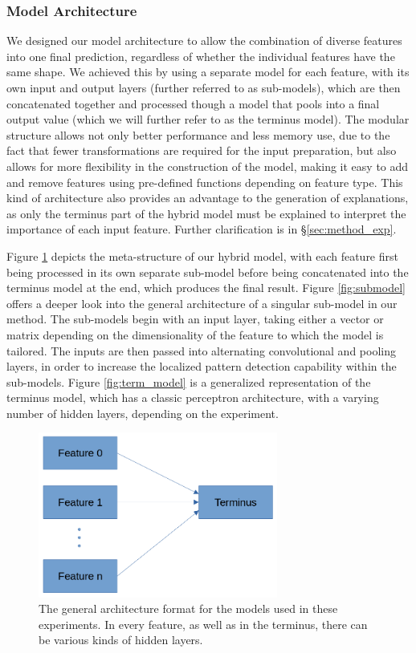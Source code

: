 \documentclass{article}
\begin{document}
			\subsubsection{Model Architecture}
			We designed our model architecture to allow the combination of diverse features into
			one final prediction, regardless of whether the individual features have the same
			shape. We achieved this by using a separate model for each feature, with its own input
			and output layers (further referred to as sub-models), which are then concatenated
			together and processed though a model that pools into a final output value (which we
			will further refer to as the terminus model). The modular structure allows not only
			better performance and less memory use, due to the fact that fewer transformations are
			required for the input preparation, but also allows for more flexibility in the
			construction of the model, making it easy to add and remove features using pre-defined
			functions depending on feature type. This kind of architecture also provides an
			advantage to the generation of explanations, as only the terminus part of the hybrid
			model must be explained to interpret the importance of each input feature. Further
			clarification is in §\ref{sec:method_exp}.
			\par
			Figure \ref{fig:model_plot} depicts the meta-structure of our hybrid model, with each
			feature first being processed in its own separate sub-model before being concatenated
			into the terminus model at the end, which produces the final result. Figure
			\ref{fig:submodel} offers a deeper look into the general architecture of a singular
			sub-model in our method. The sub-models begin with an input layer, taking either a
			vector or matrix depending on the dimensionality of the feature to which the model is
			tailored. The inputs are then passed into alternating convolutional and pooling
			layers, in order to increase the localized pattern detection capability within the
			sub-models. Figure \ref{fig:term_model} is a generalized representation of the
			terminus model, which has a classic perceptron architecture, with a varying number of
			hidden layers, depending on the experiment.
			\begin{figure}[htbp]
				\begin{center}
					\includegraphics[width=0.7\textwidth]{images/model_fig.png}
					\caption{The general architecture format for the models used in these
					experiments. In every feature, as well as in the terminus, there can be
					various kinds of hidden layers.}
					\label{fig:model_plot}
				\end{center}
			\end{figure}
\end{document}
